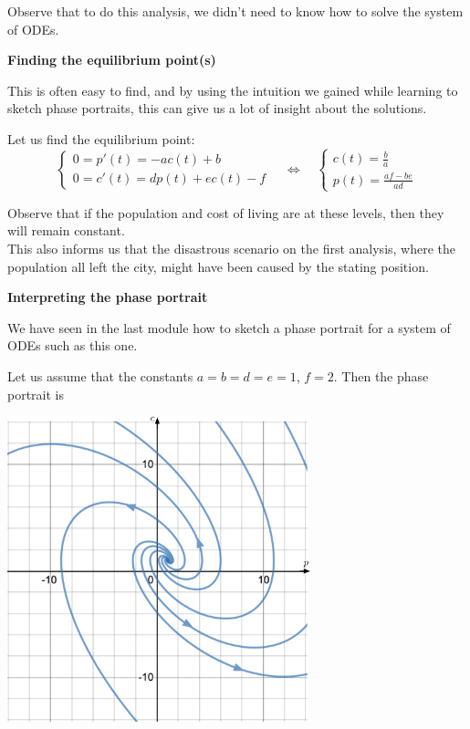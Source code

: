 Observe that to do this analysis, we didn't need to know how to solve the system of ODEs. \\






\begin{center}
\textbf{\color{cyan}
Finding the equilibrium point(s)
}
\end{center}

This is often easy to find, and by using the intuition we gained while learning to sketch phase portraits, this can give us a lot of insight about the solutions.

Let us find the equilibrium point:
$$
\begin{cases}
0= p'(t) = -a c(t) + b \\
0= c'(t) = d p(t) + e c(t) - f	
\end{cases}
\quad \Leftrightarrow \quad 
	\begin{cases}
 	\displaystyle c(t) = \frac{b}{a} \\[5pt]
	\displaystyle p(t) = \frac{af - be}{ad}
	\end{cases}
$$

Observe that if the population and cost of living are at these levels, then they will remain constant. \\

This also informs us that the disastrous scenario on the first analysis, where the population all left the city, might have been caused by the stating position. \\






\begin{center}
\textbf{\color{cyan}
Interpreting the phase portrait
}
\end{center}

We have seen in the last module how to sketch a phase portrait for a system of ODEs such as this one.

Let us assume that the constants $a=b=d=e=1$, $f=2$. Then the phase portrait is
\begin{center}
	\includegraphics*[width=250pt]{images/module18-pc.pdf}
\end{center}

